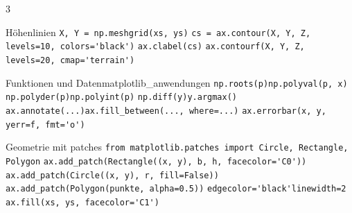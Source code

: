\documentclass[9pt,a4paper,landscape]{extarticle}
\begin{document}
\begin{multicols*}{3}
\begin{merkblock}{Höhenlinien}{}
\lstinline!X, Y = np.meshgrid(xs, ys)!\zl
\lstinline!cs = ax.contour(X, Y, Z, levels=10, colors='black')!\zl
\lstinline!ax.clabel(cs)!\zl
\lstinline!ax.contourf(X, Y, Z, levels=20, cmap='terrain')!\zl
\end{merkblock}

\begin{merkblock}[4 Anwendungen]{Funktionen und Daten}{matplotlib\_anwendungen}
\lstinline!np.roots(p)!\quad\lstinline!np.polyval(p, x)!\zl
\lstinline!np.polyder(p)!\quad\lstinline!np.polyint(p)!\zl
\lstinline!np.diff(y)!\quad\lstinline!y.argmax()!\zl
\lstinline!ax.annotate(...)!\quad\lstinline!ax.fill_between(..., where=...)!\zl
\lstinline!ax.errorbar(x, y, yerr=f, fmt='o')!\zl
\end{merkblock}

\begin{merkblock}{Geometrie mit patches}{}
\lstinline!from matplotlib.patches import Circle, Rectangle, Polygon!\zl
\lstinline!ax.add_patch(Rectangle((x, y), b, h, facecolor='C0'))!\zl
\lstinline!ax.add_patch(Circle((x, y), r, fill=False))!\zl
\lstinline!ax.add_patch(Polygon(punkte, alpha=0.5))!\zl
\lstinline!edgecolor='black'!\quad\lstinline!linewidth=2!\zl
\lstinline!ax.fill(xs, ys, facecolor='C1')!\zl
\end{merkblock}
\end{multicols*}
\end{document}
